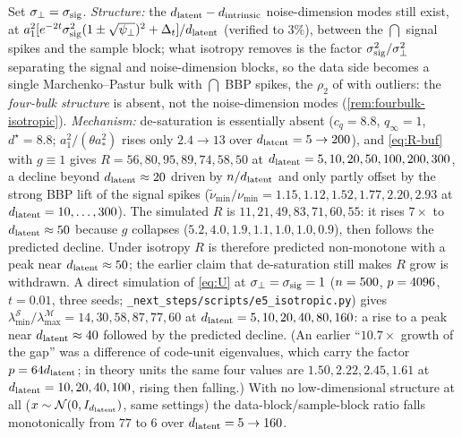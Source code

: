 \begin{remark}\label{rem:isotropic-buf}
Set $\sigma_{\perp}=\sigma_{\mathrm{sig}}$. \emph{Structure:} the $d_{\mathrm{latent}}-d_{\mathrm{intrinsic}}$ noise-dimension modes still exist, at $a_1^2[e^{-2t}\sigma_{\mathrm{sig}}^2(1\pm\sqrt{\psi_\perp})^2+\Delta_t]/d_{\mathrm{latent}}$ (verified to $3\%$), between the $\dint$ signal spikes and the sample block; what isotropy removes is the factor $\sigma_{\mathrm{sig}}^2/\sigma_{\perp}^2$ separating the signal and noise-dimension blocks, so the data side becomes a single Marchenko--Pastur bulk with $\dint$ BBP spikes, the $\rho_2$ of \citet{bonnaire2025} with outliers: the \emph{four-bulk structure} is absent, not the noise-dimension modes (\cref{rem:fourbulk-isotropic}). \emph{Mechanism:} de-saturation is essentially absent ($c_q=8.8$, $q_\infty=1$, $d^\star=8.8$; $a_1^2/(\theta a_*^2)$ rises only $2.4\to13$ over $d_{\mathrm{latent}}=5\to200$), and \eqref{eq:R-buf} with $g\equiv1$ gives $R=56,80,95,89,74,58,50$ at $d_{\mathrm{latent}}=5,10,20,50,100,200,300$, a decline beyond $d_{\mathrm{latent}}\approx20$ driven by $n/d_{\mathrm{latent}}$ and only partly offset by the strong BBP lift of the signal spikes ($\tilde\nu_{\min}/\nu_{\min}=1.15,1.12,1.52,1.77,2.20,2.93$ at $d_{\mathrm{latent}}=10,\dots,300$). The simulated $R$ is $11,21,49,83,71,60,55$: it rises $7\times$ to $d_{\mathrm{latent}}\approx50$ because $g$ collapses ($5.2,4.0,1.9,1.1,1.0,1.0,0.9$), then follows the predicted decline. Under isotropy $R$ is therefore predicted non-monotone with a peak near $d_{\mathrm{latent}}\approx50$; the earlier claim that de-saturation still makes $R$ grow is withdrawn. A direct simulation of \eqref{eq:U} at $\sigma_{\perp}=\sigma_{\mathrm{sig}}=1$ ($n=500$, $p=4096$, $t=0.01$, three seeds; \texttt{\_next\_steps/scripts/e5\_isotropic.py}) gives $\lambda^{\mathcal S}_{\min}/\lambda^{\mathcal M}_{\max}=14,30,58,87,77,60$ at $d_{\mathrm{latent}}=5,10,20,40,80,160$: a rise to a peak near $d_{\mathrm{latent}}\approx40$ followed by the predicted decline. (An earlier ``$10.7\times$ growth of the gap'' was a difference of code-unit eigenvalues, which carry the factor $p=64d_{\mathrm{latent}}$; in theory units the same four values are $1.50,2.22,2.45,1.61$ at $d_{\mathrm{latent}}=10,20,40,100$, rising then falling.) With no low-dimensional structure at all ($x\sim\mathcal N(0,I_{d_{\mathrm{latent}}})$, same settings) the data-block/sample-block ratio falls monotonically from $77$ to $6$ over $d_{\mathrm{latent}}=5\to160$.
\end{remark}

